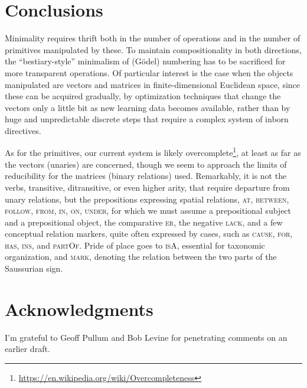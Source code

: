 \documentclass[output=paper]{langscibook}
\begin{document}
\section{Conclusions}

Minimality requires thrift both in the number of operations and in the number
of primitives manipulated by these. To maintain compositionality in both
directions, the “bestiary-style” minimalism of (Gödel) numbering has to be
sacrificed for more transparent operations. Of particular interest is the case
when the objects manipulated are vectors and matrices in finite-dimensional
Euclidean space, since these can be acquired gradually, by optimization
techniques that change the vectors only a little bit as new learning data
becomes available, rather than by huge and unpredictable discrete steps that
require a complex system of inborn directives.

As for the primitives, our current system is likely
overcomplete\footnote{\url{https://en.wikipedia.org/wiki/Overcompleteness}}, at least
as far as the vectors (unaries) are concerned, though we seem to approach the
limits of reducibility for the matrices (binary relations) used. Remarkably,
it is not the verbs, transitive, ditransitive, or even higher arity, that
require departure from unary relations, but the prepositions expressing
spatial relations, \textsc{at, between, follow, from, in, on, under,} for which we must
assume a prepositional subject and a prepositional object, the comparative
\textsc{er}, the negative \textsc{lack}, and a few conceptual relation markers,
quite often expressed by cases, such as \textsc{cause, for, has, ins}, and \textsc{partOf}. Pride of place goes to \textsc{isA}, essential for taxonomic
organization, and \textsc{mark}, denoting the relation between the two parts of
the Saussurian sign.






\section*{Acknowledgments} I'm grateful to Geoff Pullum and Bob Levine for
penetrating comments on an earlier draft.

\sloppy
\printbibliography[heading=subbibliography,notkeyword=this]
\end{document}

